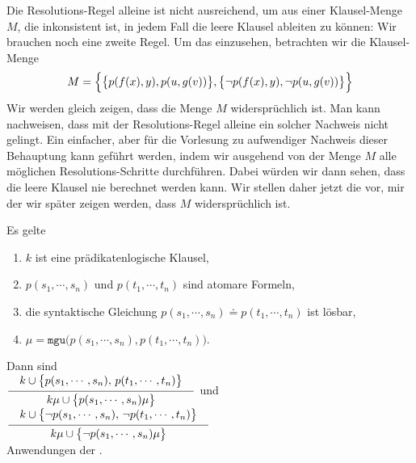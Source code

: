 \noindent
Die Resolutions-Regel alleine ist nicht ausreichend, um aus einer Klausel-Menge $M$, die
inkonsistent ist, in 
jedem Fall die leere Klausel ableiten zu können: Wir brauchen noch eine zweite Regel.
Um das einzusehen, betrachten wir die Klausel-Menge 
\[ M = \Bigl\{ \bigl\{p(f(x),y), p(u,g(v))\bigr\}, 
               \bigl\{\neg p(f(x),y), \neg p(u,g(v))\bigr\} \Bigr\} 
\]
Wir werden gleich zeigen, dass die Menge $M$ widersprüchlich ist.  Man kann nachweisen,
dass mit der Resolutions-Regel alleine ein solcher Nachweis nicht gelingt.
Ein einfacher, aber für die Vorlesung zu aufwendiger Nachweis dieser Behauptung kann
geführt werden, indem wir ausgehend von der Menge $M$ alle möglichen Resolutions-Schritte
durchführen.  Dabei würden wir dann sehen, dass die leere Klausel nie berechnet werden kann.
Wir stellen daher jetzt die
 vor, mir der wir später zeigen werden, dass $M$ widersprüchlich
ist.


\begin{Definition}  Es gelte 
  \begin{enumerate}
  \item $k$ ist  eine prädikatenlogische Klausel,
  \item $p(s_1,\cdots,s_n)$ und $p(t_1,\cdots,t_n)$ sind atomare Formeln,
  \item die syntaktische Gleichung $p(s_1,\cdots,s_n)  \doteq p(t_1,\cdots,t_n)$ ist lösbar, 
  \item $\mu = \mathtt{mgu}\bigl(p(s_1,\cdots,s_n), p(t_1,\cdots,t_n)\bigr)$.
  \end{enumerate}
  Dann sind \\[0.3cm]
  \hspace*{0.8cm}
  $\schluss{k \cup \bigl\{p(s_1,\cdots,s_n),\, p(t_1,\cdots,t_n)\bigl\}}{k\mu \cup \bigl\{p(s_1,\cdots,s_n)\mu\bigr\} }$ 
  \quad und \quad
  $\schluss{k \cup \bigl\{ \neg p(s_1,\cdots,s_n),\, \neg p(t_1,\cdots,t_n)\bigl\}}{k\mu \cup \bigl\{\neg p(s_1,\cdots,s_n)\mu\bigr\} }$ 
  \\[0.3cm]
  Anwendungen der .
  \eox
\end{Definition}

